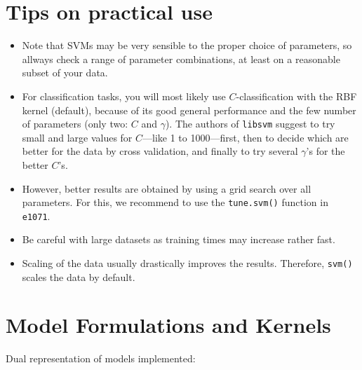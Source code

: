 \documentclass[a4paper]{article}
\newcommand{\pkg}[1]{\texttt{#1}}
\begin{document}
\section*{Tips on practical use}
\begin{itemize}
 \item Note that SVMs may be very
  sensible to the proper choice of parameters, so allways check a range
  of parameter combinations, at least on a reasonable subset of your
  data.
 \item For classification tasks, you will most likely use
  $C$-classification with the RBF kernel (default), because of its good
  general performance and the few number of parameters 
  (only two: $C$ and $\gamma$). The authors of \pkg{libsvm} suggest
  to try small and large values for $C$---like 1 to 1000---first,
  then to decide which are
  better for the data by cross validation, and finally to try
  several $\gamma$'s for the better $C$'s.
 \item However, better results are obtained by using a grid search
 over all parameters. For this, we recommend to use the
 \texttt{tune.svm()} function in \pkg{e1071}.
 \item Be careful with large datasets as training times may increase
  rather fast.
 \item Scaling of the data usually drastically improves the
 results. Therefore, \texttt{svm()} scales the data by default.
\end{itemize}

\section*{Model Formulations and Kernels}

Dual representation of models implemented:
\end{document}
